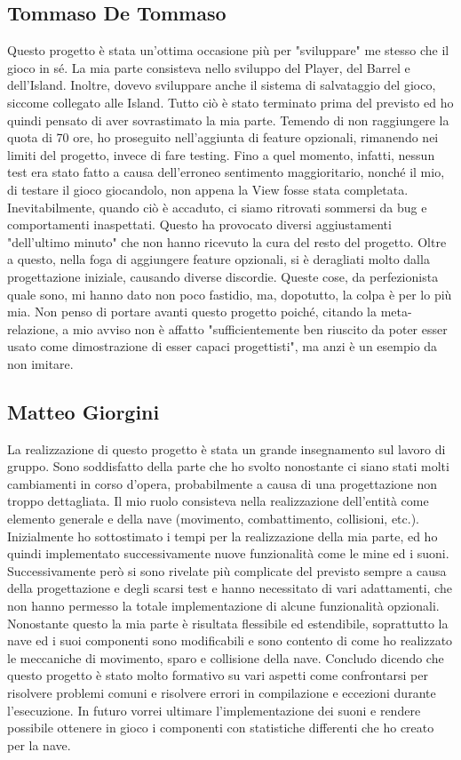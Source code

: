 \documentclass[a4paper,12pt]{report}
\begin{document}
\subsection*{Tommaso De Tommaso}
Questo progetto è stata un'ottima occasione più per "sviluppare" me stesso che il gioco in sé.
%
La mia parte consisteva nello sviluppo del Player, del Barrel e dell'Island.
%
Inoltre, dovevo sviluppare anche il sistema di salvataggio del gioco, siccome collegato alle Island.
%
Tutto ciò è stato terminato prima del previsto ed ho quindi pensato di aver sovrastimato la mia parte.
%
Temendo di non raggiungere la quota di 70 ore, ho proseguito nell'aggiunta di feature opzionali, rimanendo nei limiti del progetto, invece di fare testing.
%
Fino a quel momento, infatti, nessun test era stato fatto a causa dell'erroneo sentimento maggioritario, nonché il mio, di testare il gioco giocandolo, non appena la View fosse stata completata.
%
Inevitabilmente, quando ciò è accaduto, ci siamo ritrovati sommersi da bug e comportamenti inaspettati.
%
Questo ha provocato diversi aggiustamenti "dell'ultimo minuto" che non hanno ricevuto la cura del resto del progetto.
%
Oltre a questo, nella foga di aggiungere feature opzionali, si è deragliati molto dalla progettazione iniziale, causando diverse discordie.
%
Queste cose, da perfezionista quale sono, mi hanno dato non poco fastidio, ma, dopotutto, la colpa è per lo più mia.
%
Non penso di portare avanti questo progetto poiché, citando la meta-relazione, a mio avviso non è affatto "sufficientemente ben riuscito da poter esser usato come dimostrazione di esser capaci progettisti", ma anzi è un esempio da non imitare.

\subsection*{Matteo Giorgini}
La realizzazione di questo progetto è stata un grande insegnamento sul lavoro di gruppo.
%
Sono soddisfatto della parte che ho svolto nonostante ci siano stati molti cambiamenti in corso d'opera, probabilmente a causa di una progettazione non troppo dettagliata.
%
Il mio ruolo consisteva nella realizzazione dell'entità come elemento generale e della nave (movimento, combattimento, collisioni, etc.).
%
Inizialmente ho sottostimato i tempi per la realizzazione della mia parte, ed ho quindi implementato successivamente nuove funzionalità come le mine ed i suoni.
%
Successivamente però si sono rivelate più complicate del previsto sempre a causa della progettazione e degli scarsi test e hanno necessitato di vari adattamenti,
che non hanno permesso la totale implementazione di alcune funzionalità opzionali.
%
Nonostante questo la mia parte è risultata flessibile ed estendibile, soprattutto la nave ed i suoi componenti sono modificabili e sono contento di come ho realizzato le meccaniche di movimento, sparo e collisione della nave.
%
Concludo dicendo che questo progetto è stato molto formativo su vari aspetti come confrontarsi per risolvere problemi comuni e risolvere errori in compilazione e eccezioni durante l'esecuzione.
%
In futuro vorrei ultimare l'implementazione dei suoni e rendere possibile ottenere in gioco i componenti con statistiche differenti che ho creato per la nave.
\end{document}
